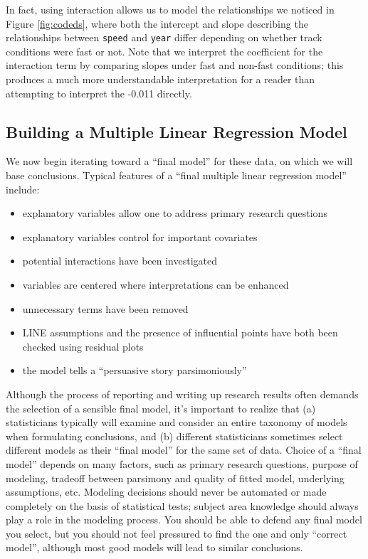 \documentclass[
]{krantz}
\providecommand{\tightlist}{%
  \setlength{\itemsep}{0pt}\setlength{\parskip}{0pt}}
\begin{document}
In fact, using interaction allows us to model the relationships we noticed in Figure \ref{fig:codeds}, where both the intercept and slope describing the relationships between \texttt{speed} and \texttt{year} differ depending on whether track conditions were fast or not. Note that we interpret the coefficient for the interaction term by comparing slopes under fast and non-fast conditions; this produces a much more understandable interpretation for a reader than attempting to interpret the -0.011 directly.

\hypertarget{multreg_build}{%
\subsection{Building a Multiple Linear Regression Model}\label{multreg_build}}

We now begin iterating toward a ``final model'' for these data, on which we will base conclusions. Typical features of a ``final multiple linear regression model'' include:

\begin{itemize}
\tightlist
\item
  explanatory variables allow one to address primary research questions
\item
  explanatory variables control for important covariates
\item
  potential interactions have been investigated
\item
  variables are centered where interpretations can be enhanced
\item
  unnecessary terms have been removed
\item
  LINE assumptions and the presence of influential points have both been checked using residual plots
\item
  the model tells a ``persuasive story parsimoniously''
\end{itemize}

Although the process of reporting and writing up research results often demands the selection of a sensible final model, it's important to realize that (a) statisticians typically will examine and consider an entire taxonomy of models when formulating conclusions, and (b) different statisticians sometimes select different models as their ``final model'' for the same set of data. Choice of a ``final model'' depends on many factors, such as primary research questions, purpose of modeling, tradeoff between parsimony and quality of fitted model, underlying assumptions, etc. Modeling decisions should never be automated or made completely on the basis of statistical tests; subject area knowledge should always play a role in the modeling process. You should be able to defend any final model you select, but you should not feel pressured to find the one and only ``correct model'', although most good models will lead to similar conclusions.
\end{document}
